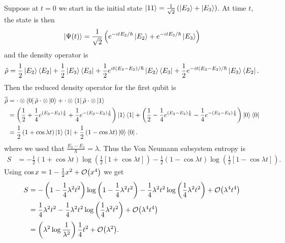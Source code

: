 Suppose at \(t=0\) we start in the initial state \(\left|11\right\rangle = \frac{1}{\sqrt{2}}\left(\left|E_2\right\rangle+\left|E_3\right\rangle\right)\). At time \(t\), the state is then
\[
\left|\Psi(t)\right\rangle = \frac{1}{\sqrt{2}}\left(e^{-itE_2/\hbar}\left|E_2\right\rangle + e^{-itE_3/\hbar} \left|E_3\right\rangle\right)
\]
and the density operator is
\[
\hat{\rho} = \frac{1}{2}\left|E_2\right\rangle\left\langle E_2\right| + \frac{1}{2}\left|E_3\right\rangle\left\langle E_3\right| + \frac{1}{2} e^{it\left(E_3-E_2\right)/\hbar} \left|E_2\right\rangle\left\langle E_3\right| + \frac{1}{2} e^{-it\left(E_3 - E_2\right)/\hbar} \left|E_3\right\rangle\left\langle E_2\right|.
\]
Then the reduced density operator for the first qubit is
\begin{align*}
\overline{\hat{\rho}} &= \cdot\otimes\left\langle0\right| \hat{\rho} \cdot\otimes\left|0\right\rangle + \cdot\otimes\left\langle1\right| \hat{\rho} \cdot\otimes\left|1\right\rangle \\
&= \left(\frac{1}{2} + \frac{1}{4}e^{\left(E_3-E_2\right)\frac{t}{\hbar}} + \frac{1}{4}e^{-\left(E_3-E_2\right)\frac{t}{\hbar}} \right)\left|1\right\rangle\left\langle1\right| + \left(\frac{1}{2} -\frac{1}{4}e^{\left(E_3-E_2\right)\frac{t}{\hbar}} -\frac{1}{4}e^{-\left(E_3-E_2\right)\frac{t}{\hbar}} \right)\left|0\right\rangle\left\langle0\right| \\
&= \frac{1}{2}\left(1 + \cos \lambda t \right)\left|1\right\rangle\left\langle1\right| + \frac{1}{2}\left(1 -\cos \lambda t \right)\left|0\right\rangle\left\langle0\right|.
\end{align*}
where we used that \(\frac{E_3-E_2}{\hbar} = \lambda\). Thus the Von Neumann subsystem entropy is
\begin{align*}
S &= -\frac{1}{2}\left(1 + \cos \lambda t \right)\log \left(\frac{1}{2}\left[1+\cos \lambda t\right]\right)
- \frac{1}{2}\left(1 - \cos \lambda t \right)\log \left(\frac{1}{2}\left[1-\cos\lambda t\right]\right).
\end{align*}
Using \(\cos x = 1-\frac{1}{2} x^2 + \mathcal{O}{\left(x^4\right)}\) we get
\begin{align*}
S &=- \left(1-\frac{1}{4}\lambda^2 t^2\right) \log \left(1-\frac{1}{4}\lambda^2 t^2\right) - \frac{1}{4}\lambda^2 t^2 \log \left(\frac{1}{4}\lambda^2 t^2\right) + \mathcal{O}{\left(\lambda^4 t^4\right)}\\
&=\frac{1}{4}\lambda^2 t^2 - \frac{1}{4}\lambda^2 t^2 \log \left(\frac{1}{4}\lambda^2 t^2\right) + \mathcal{O}{\left(\lambda^4 t^4\right)}\\
&= \left(\lambda^2 \log \frac{1}{\lambda^2}\right) \frac{1}{4} t^2 + \mathcal{O}{\left(\lambda^2\right)}.
\end{align*}

